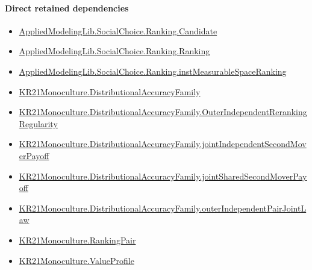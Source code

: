 \documentclass[10pt]{article}
\begin{document}
\paragraph{Direct retained dependencies}
\begin{itemize}\raggedright
\item \hyperlink{library-prerequisite-8c0e6c25845ae78a}{Applied\allowbreak{}Modeling\allowbreak{}Lib.\allowbreak{}Social\allowbreak{}Choice.\allowbreak{}Ranking.\allowbreak{}Candidate}
\item \hyperlink{library-prerequisite-5cde54446d1ae021}{Applied\allowbreak{}Modeling\allowbreak{}Lib.\allowbreak{}Social\allowbreak{}Choice.\allowbreak{}Ranking.\allowbreak{}Ranking}
\item \hyperlink{governing-declaration-30ca9c740ef703ec}{Applied\allowbreak{}Modeling\allowbreak{}Lib.\allowbreak{}Social\allowbreak{}Choice.\allowbreak{}Ranking.\allowbreak{}inst\allowbreak{}Measurable\allowbreak{}Space\allowbreak{}Ranking}
\item \hyperlink{paper-prerequisite-ee564fa2921e1add}{KR21\allowbreak{}Monoculture.\allowbreak{}Distributional\allowbreak{}Accuracy\allowbreak{}Family}
\item \hyperlink{governing-declaration-4309a5232b3e1f2f}{KR21\allowbreak{}Monoculture.\allowbreak{}Distributional\allowbreak{}Accuracy\allowbreak{}Family.\allowbreak{}Outer\allowbreak{}Independent\allowbreak{}Reranking\allowbreak{}Regularity}
\item \hyperlink{governing-declaration-e9ffafacdfd323b7}{KR21\allowbreak{}Monoculture.\allowbreak{}Distributional\allowbreak{}Accuracy\allowbreak{}Family.\allowbreak{}joint\allowbreak{}Independent\allowbreak{}Second\allowbreak{}Mover\allowbreak{}Payoff}
\item \hyperlink{governing-declaration-47f2c4e732fcdf23}{KR21\allowbreak{}Monoculture.\allowbreak{}Distributional\allowbreak{}Accuracy\allowbreak{}Family.\allowbreak{}joint\allowbreak{}Shared\allowbreak{}Second\allowbreak{}Mover\allowbreak{}Payoff}
\item \hyperlink{governing-declaration-e6c9a24a5d927c25}{KR21\allowbreak{}Monoculture.\allowbreak{}Distributional\allowbreak{}Accuracy\allowbreak{}Family.\allowbreak{}outer\allowbreak{}Independent\allowbreak{}Pair\allowbreak{}Joint\allowbreak{}Law}
\item \hyperlink{governing-declaration-90a7e19d973f51cb}{KR21\allowbreak{}Monoculture.\allowbreak{}Ranking\allowbreak{}Pair}
\item \hyperlink{paper-prerequisite-c0e41e9b0e843969}{KR21\allowbreak{}Monoculture.\allowbreak{}Value\allowbreak{}Profile}
\end{itemize}
\hypertarget{governing-declaration-8b42286fdc45ddc7}{}
\end{document}
